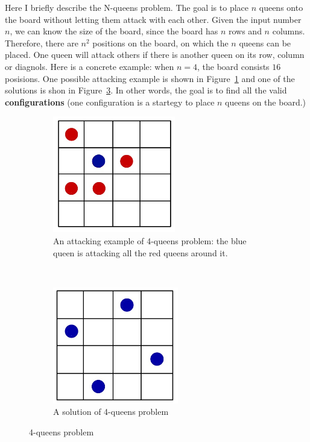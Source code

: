 Here I briefly describe the N-queens problem. The goal is to place $n$ queens onto the board without letting them attack with each other. Given the input number $n$, we can know the size of the board, since the board has $n$ rows and $n$ columns. Therefore, there are $n^2$ positions on the board, on which the $n$ queens can be placed. One queen will attack others if there is another queen on its row, column or diagnols. Here is a concrete example: when $n=4$, the board consists $16$ posisions. One possible attacking example is shown in Figure~\ref{fig:4queensAttack} and one of the solutions is shon in Figure~\ref{fig:4queensSolution}. In other words, the goal is to find all the valid \textbf{configurations} (one configuration is a startegy to place $n$ queens on the board.)

\begin{figure}[ht]
  \centering
  \begin{subfigure}[t]{0.5\textwidth}
    \includegraphics[height=2in]{figure/4QueensAttack.JPG}
    \caption{An attacking example of 4-queens problem: the blue queen is attacking all the red queens around it.}
    \label{fig:4queensAttack}
  \end{subfigure}%
  ~  
  \begin{subfigure}[t]{0.5\textwidth}
    \includegraphics[height=2in]{figure/4QueensSolution.JPG}
    \caption{A solution of 4-queens problem}
    \label{fig:4queensSolution}
  \end{subfigure}%
  \caption{4-queens problem}
\end{figure}

